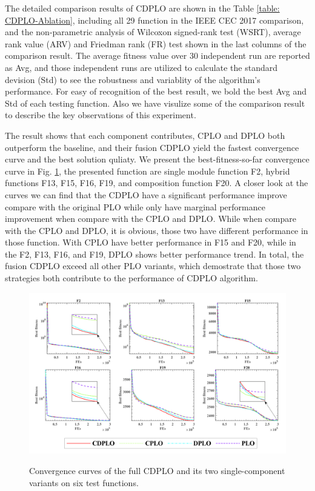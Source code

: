 \documentclass[review]{elsarticle}
\begin{document}
The detailed comparison results of CDPLO are shown in the Table \ref{table: CDPLO-Ablation}, including all 29 function in the IEEE CEC 2017 comparison, and the non-parametric analysis of Wilcoxon signed-rank test (WSRT), average rank value (ARV) and Friedman rank (FR) test shown in the last columns of the comparison result. The average fitness value over 30 independent run are reported as Avg, and those independent runs are utilized to calculate the standard devision (Std) to see the robustness and variablity of the algorithm's performance. For easy of recognition of the best result, we bold the best Avg and Std of each testing function. Also we have visulize some of the comparison result to describe the key observations of this experiment.

The result shows that each component contributes, CPLO and DPLO both outperform the baseline, and their fusion CDPLO yield the fastest convergence curve and the best solution quliaty. We present the best-fitness-so-far convergence curve in Fig. \ref{fig: CDPLO-Ablation-CC}, the presented function are single module function F2, hybrid functions F13, F15, F16, F19, and composition function F20. A closer look at the curves we can find that the CDPLO have a significant performance improve compare with the original PLO while only have marginal performance improvement when compare with the CPLO and DPLO. While when compare with the CPLO and DPLO, it is obvious, those two have different performance in those function. With CPLO have better performance in F15 and F20, while in the F2, F13, F16, and F19, DPLO shows better performance trend. In total, the fusion CDPLO exceed all other PLO variants, which demostrate that those two strategies both contribute to the performance of CDPLO algorithm. 

\begin{figure}
\centering
\caption{Convergence curves of the full CDPLO and its
           two single-component variants on six test
           functions.}
\includegraphics[width=\linewidth]{CDPLO-Ablation}
\label{fig: CDPLO-Ablation-CC}
\end{figure}
\end{document}

